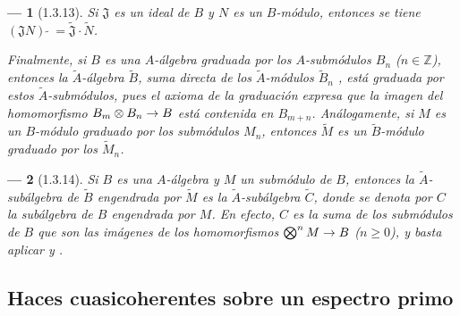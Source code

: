 \documentclass[oneside]{amsart}
\theoremstyle{ega-env-style}
\newtheorem*{env}{---}
\theoremstyle{ega-thm-env-style}
\theoremstyle{ega-defn-env-style}
\def\geq{\geqslant}                 %
\def\supertilde{{\,\widetilde{\,}\,}}   %
\renewcommand{\to}{\mathchoice{\longrightarrow}{\rightarrow}{\rightarrow}{\rightarrow}}
\let\EGAOriginalLabel\label
\renewcommand{\label}[1]{\phantomsection\EGAOriginalLabel{#1}}
\begin{document}
\begin{env}[1.3.13]
Si $\mathfrak{J}$ es un ideal de $B$ y $N$ es un $B$-módulo, entonces se tiene $(\mathfrak{J}N)\supertilde=\widetilde{\mathfrak{J}}\cdot\widetilde{N}$.

Finalmente, si $B$ es una $A$-álgebra \emph{graduada} por los $A$-submódulos $B_n$ ($n\in\mathbb{Z}$), entonces la $\widetilde{A}$-álgebra $\widetilde{B}$, suma directa de los $\widetilde{A}$-módulos $\widetilde{B}_n$ , está graduada por estos $\widetilde{A}$-submódulos, pues el axioma de la graduación expresa que la imagen del homomorfismo $B_m\otimes B_n\to B$ está contenida en $B_{m+n}$.
Análogamente, si $M$ es un $B$-módulo graduado por los submódulos $M_n$, entonces $\widetilde{M}$ es un $\widetilde{B}$-módulo graduado por los $\widetilde{M}_n$.
\end{env}

\begin{env}[1.3.14]
\label{I.1.3.14}
Si $B$ es una $A$-álgebra y $M$ un submódulo de $B$, entonces la $\widetilde{A}$-subálgebra de $\widetilde{B}$ engendrada por $\widetilde{M}$  es la $\widetilde{A}$-subálgebra $\widetilde{C}$, donde se denota por $C$ la subálgebra de $B$ engendrada por $M$.
En efecto, $C$ es la suma de los submódulos de $B$ que son las imágenes de los homomorfismos $\bigotimes^n M\to B$ ($n\geq0$), y basta aplicar  y .
\end{env}

\subsection{Haces cuasicoherentes sobre un espectro primo}
\label{subsection:I.1.4}
\end{document}
